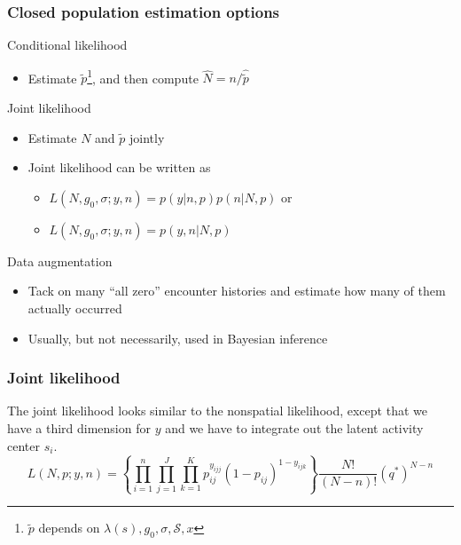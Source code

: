 \documentclass[color=usenames,dvipsnames]{beamer}\usepackage[]{graphicx}\usepackage[]{color}
\begin{document}
\begin{frame}
  \frametitle{Closed population estimation options}
  Conditional likelihood \\
  \begin{itemize}
    \item Estimate $\tilde{p}$\footnote{$\tilde{p}$ depends on $\lambda(s), g_0,
        \sigma, \mathcal{S}, x$}, and then compute $\hat{N}=n/\hat{\tilde{p}}$
  \end{itemize}
  \pause
  \vfill
  Joint likelihood \\
  \begin{itemize}
    \item Estimate $N$ and $\tilde{p}$ jointly
    \item Joint likelihood can be written as
      \begin{itemize}
      \item $L(N,g_0,\sigma;y,n) = p(y|n,p)p(n|N,p)$ or
      \item $L(N,g_0,\sigma;y,n) = p(y,n|N,p)$
      \end{itemize}
  \end{itemize}
  \pause \vfill
  Data augmentation \\
  \begin{itemize}
    \item Tack on many ``all zero'' encounter histories and estimate
      how many of them actually occurred
    \item Usually, but not necessarily, used in Bayesian inference
  \end{itemize}
\end{frame}









\begin{frame}
  \frametitle{Joint likelihood}
  \small
  The joint likelihood looks similar to the nonspatial likelihood,
  except that we have a third dimension for $y$ and we have to
  integrate out the latent activity center $s_i$. 
  \pause
  \vfill
  \flushleft
  \begin{equation*}
    L(N,p; y,n) = \left\{\prod_{i=1}^n \prod_{j=1}^J \prod_{k=1}^K p_{ij}^{y_{ijj}}(1-p_{ij})^{1-y_{ijk}}\right\}
    \frac{N!}{(N-n)!}  \left(q^*\right)^{N-n}
  \end{equation*}
\end{frame}
\end{document}
